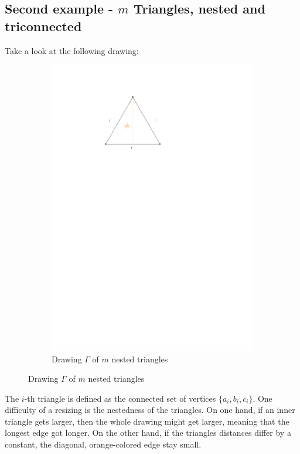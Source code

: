 \subsection{Second example - $m$ Triangles, nested and triconnected}
Take a look at the following drawing:
\begin{figure}[H]
	\centering
	\begin{subfigure}{0.8\textwidth}
		\centering
		\includegraphics[page=4]{drawings/previous-results.pdf}
		\caption*{Drawing $\Gamma$ of $m$ nested triangles}
	\end{subfigure}
\end{figure}
The $i$-th triangle is defined as the connected set of vertices $\{a_i,b_i,c_i\}$. One difficulty of a resizing is the nestedness of the triangles. On one hand, if an inner triangle gets larger, then the whole drawing might get larger, meaning that the longest edge got longer. On the other hand, if the triangles distances differ by a constant, the diagonal, orange-colored edge stay small.\\
